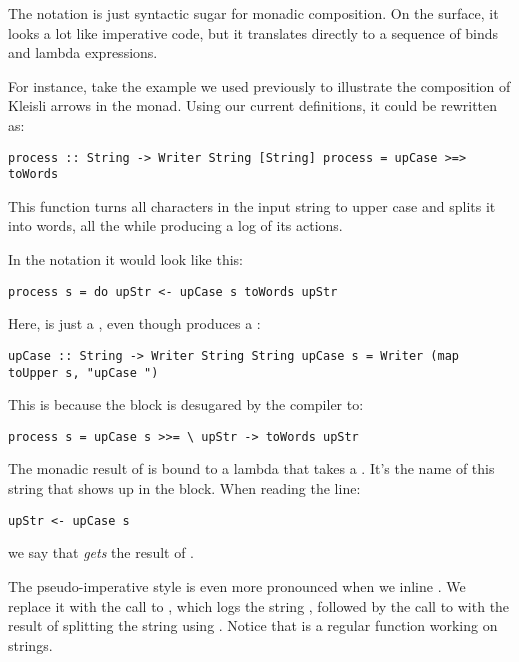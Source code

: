The  notation is just syntactic sugar for monadic
composition. On the surface, it looks a lot like imperative code, but it
translates directly to a sequence of binds and lambda expressions.

For instance, take the example we used previously to illustrate the
composition of Kleisli arrows in the  monad. Using our
current definitions, it could be rewritten as:

\begin{verbatim}
process :: String -> Writer String [String] process = upCase >=> toWords
\end{verbatim}

This function turns all characters in the input string to upper case and
splits it into words, all the while producing a log of its actions.

In the  notation it would look like this:

\begin{verbatim}
process s = do upStr <- upCase s toWords upStr
\end{verbatim}

Here,  is just a , even though
 produces a :

\begin{verbatim}
upCase :: String -> Writer String String upCase s = Writer (map toUpper s, "upCase ")
\end{verbatim}

This is because the  block is desugared by the compiler to:

\begin{verbatim}
process s = upCase s >>= \ upStr -> toWords upStr
\end{verbatim}

The monadic result of  is bound to a lambda that takes a
. It's the name of this string that shows up in the
 block. When reading the line:

\begin{verbatim}
upStr <- upCase s
\end{verbatim}

we say that  \emph{gets} the result of .

The pseudo-imperative style is even more pronounced when we inline
. We replace it with the call to , which
logs the string , followed by the call to
 with the result of splitting the string 
using . Notice that  is a regular function
working on strings.

